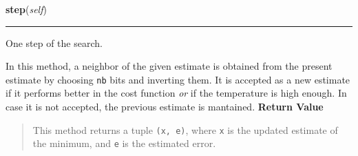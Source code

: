     \label{peach:sa:base:BinarySA:step}

    \vspace{0.5ex}

\hspace{.8\funcindent}\begin{boxedminipage}{\funcwidth}

    \raggedright \textbf{step}(\textit{self})

    \vspace{-1.5ex}

    \rule{\textwidth}{0.5\fboxrule}
\setlength{\parskip}{2ex}

One step of the search.

In this method, a neighbor of the given estimate is obtained from the
present estimate by choosing \texttt{nb} bits and inverting them. It is
accepted as a new estimate if it performs better in the cost function
\emph{or} if the temperature is high enough. In case it is not accepted, the
previous estimate is mantained.
\setlength{\parskip}{1ex}
      \textbf{Return Value}
    \vspace{-1ex}

      \begin{quote}

This method returns a tuple \texttt{(x, e)}, where \texttt{x} is the updated
estimate of the minimum, and \texttt{e} is the estimated error.
      \end{quote}

    \end{boxedminipage}

    \label{peach:sa:base:BinarySA:__call__}

    \vspace{0.5ex}

